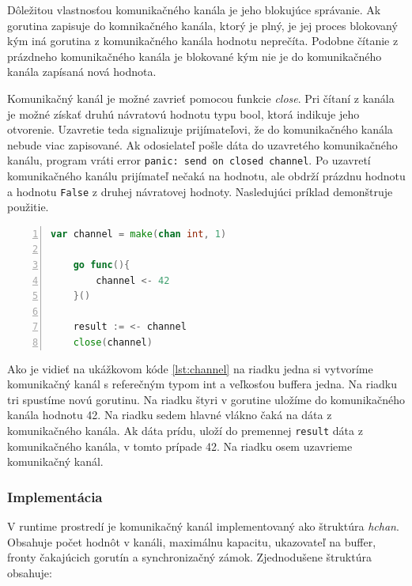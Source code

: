 \documentclass[
  biblatex,
  seconds=true,
  language=slovak,
  figures=false,
  urldate=iso,
  glossaries,
  index
]{kidiplom}
\begin{document}
Dôležitou vlastnosťou komunikačného kanála je jeho blokujúce správanie. Ak gorutina zapisuje do komnikačného kanála, ktorý je plný, je jej proces
blokovaný kým iná gorutina z komunikačného kanála hodnotu neprečíta. Podobne čítanie z prázdneho komunikačného kanála je blokované kým nie je do
komunikačného kanála zapísaná nová hodnota.

Komunikačný kanál je možné zavrieť pomocou funkcie \emph{close}.
Pri čítaní z kanála je možné získať druhú návratovú hodnotu typu bool, ktorá indikuje jeho otvorenie.
Uzavretie teda signalizuje prijímateľovi, že do komunikačného kanála nebude viac zapisované. Ak odosielateľ pošle dáta do
uzavretého komunikačného kanálu,
program vráti error \texttt{panic: send on closed channel}. Po uzavretí komunikačného kanálu prijímateľ nečaká na hodnotu,
ale obdrží prázdnu hodnotu a hodnotu \texttt{False} z druhej návratovej hodnoty.
Nasledujúci príklad demonštruje použitie.
\begin{lstlisting}[language=Go, numbers=left, caption={Použitie komunikačného kanála}, captionpos=b, label={lst:channel}]
    var channel = make(chan int, 1)

    go func(){
        channel <- 42
    }()

    result := <- channel
    close(channel)
\end{lstlisting}
Ako je vidieť na ukážkovom kóde \ref{lst:channel} na riadku jedna si vytvoríme komunikačný kanál s referečným typom int a veľkosťou buffera jedna. Na riadku tri spustíme novú gorutinu.
Na riadku štyri v gorutine uložíme do komunikačného kanála hodnotu 42. Na riadku sedem hlavné vlákno čaká na dáta z komunikačného kanála. Ak dáta prídu,
uloží do premennej \texttt{result} dáta z komunikačného kanála, v tomto prípade 42. Na riadku osem uzavrieme komunikačný kanál.

\subsubsection{Implementácia}
V runtime prostredí je komunikačný kanál implementovaný ako štruktúra \emph{hchan}. Obsahuje počet hodnôt v kanáli, maximálnu
kapacitu, ukazovateľ na buffer, fronty čakajúcich gorutín a synchronizačný zámok. Zjednodušene štruktúra obsahuje:
\end{document}
